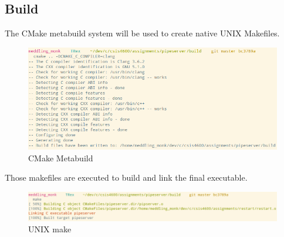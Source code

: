 \documentclass[letter,12pt,sffamily]{article}
\begin{document}
\subsection{Build}
The CMake metabuild system will be used to create native UNIX Makefiles. 
\begin{figure}[H]
	\centering
	\includegraphics[width=1\linewidth]{./images/1}
	\caption[CMake_prep]{CMake Metabuild}
	\label{fig:1}
\end{figure}
Those makefiles are executed to build and link the final executable.
\begin{figure}[H]
	\centering
	\includegraphics[width=1\linewidth]{./images/2}
	\caption[make_build]{UNIX make}
	\label{fig:2}
\end{figure}
\end{document}
